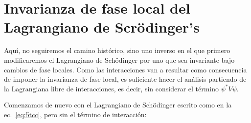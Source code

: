 \section{Invarianza de fase local del Lagrangiano de  Scrödinger's}

Aquí, no seguiremos el camino histórico, sino uno inverso en el  que primero modificaremos el Lagrangiano de Sch\"odinger por uno que sea invariante bajo cambios de fase locales. Como las interacciones van a resultar como consecuencia de imponer la invarianza de fase local, es suficiente hacer el análisis partiendo de la Lagrangiana libre de interacciones, es decir, sin considerar el término $\psi^{*}V\psi$.

Comenzamos de nuevo con el Lagrangiano de Schödinger escrito como en la ec.~\eqref{eq:5tcc}, pero sin el término de interacción:

